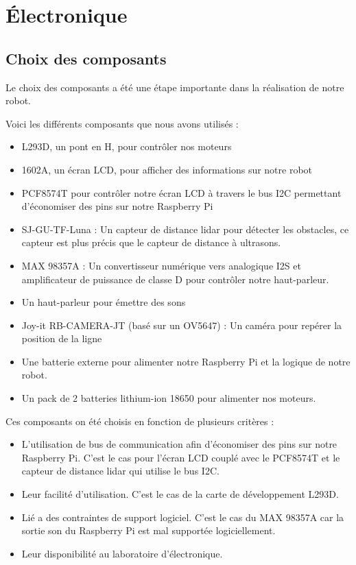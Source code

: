 \section{Électronique}

\subsection{Choix des composants}

Le choix des composants a été une étape importante dans la réalisation de notre robot.

Voici les différents composants que nous avons utilisés :
\begin{itemize}
    \item L293D, un pont en H, pour contrôler nos moteurs
    \item 1602A, un écran LCD, pour afficher des informations sur notre robot
    \item PCF8574T pour contrôler notre écran LCD à travers le bus I2C permettant d'économiser des pins sur notre Raspberry Pi
    \item SJ-GU-TF-Luna : Un capteur de distance lidar pour détecter les obstacles, ce capteur est plus précis que le capteur de distance à ultrasons.
    \item MAX 98357A : Un convertisseur numérique vers analogique I2S et amplificateur de puissance de classe D pour contrôler notre haut-parleur.
    \item Un haut-parleur pour émettre des sons
    \item Joy-it RB-CAMERA-JT (basé sur un OV5647) : Un caméra pour repérer la position de la ligne
    \item Une batterie externe pour alimenter notre Raspberry Pi et la logique de notre robot.
    \item Un pack de 2 batteries lithium-ion 18650 pour alimenter nos moteurs.
\end{itemize}

Ces composants on été choisis en fonction de plusieurs critères :
\begin{itemize}
    \item L'utilisation de bus de communication afin d'économiser des pins sur notre Raspberry Pi. C'est le cas pour l'écran LCD couplé avec le PCF8574T et le capteur de distance lidar qui utilise le bus I2C.
    \item Leur facilité d'utilisation. C'est le cas de la carte de développement L293D.
    \item Lié a des contraintes de support logiciel. C'est le cas du MAX 98357A car la sortie son du Raspberry Pi est mal supportée logiciellement.
    \item Leur disponibilité au laboratoire d'électronique.
\end{itemize}

